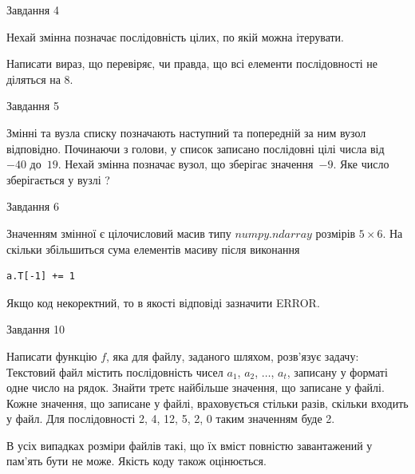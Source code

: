 \documentclass[12pt, ukrainian]{article}
\begin{document}
{               
{\begin{center}Завдання {4}\end{center}}
\vspace{-6mm}
Нехай змінна  позначає послідовність цілих, по якій можна ітерувати.

Написати вираз, що перевіряє, чи правда, що всі елементи послідовності не діляться на 8.\par

\vspace{10mm}
               
{\begin{center}Завдання {5}\end{center}}
\vspace{-6mm}
Змінні  та  вузла списку позначають наступний та попередній за ним вузол відповідно. Починаючи з голови, у список записано послідовні цілі числа від~$-40$ до~$19$. Нехай змінна  позначає вузол, що зберігає значення~$-9$.
Яке число зберігається у вузлі  ?\par

               
{\begin{center}Завдання {6}\end{center}}
\vspace{-6mm}
Значенням змінної  є цілочисловий масив типу $numpy.ndarray$ розмірів $5{\times}6$. На скільки збільшиться сума елементів масиву  після виконання
\begin{verbatim}
a.T[-1] += 1
\end{verbatim}


Якщо код некоректний, то в якості відповіді зазначити ERROR.\par

               
{\begin{center}Завдання {10}\end{center}}
\vspace{-6mm}

Написати функцію $f$, яка для файлу, заданого шляхом, розв’язує задачу:\\ Текстовий файл містить послідовність чисел $a_1$, $a_2$, $\ldots$, $a_t$, записану у форматі одне число на рядок. Знайти третє найбільше значення, що записане у файлі. Кожне значення, що записане у файлі, враховується стільки разів, скільки входить у файл. Для послідовності 2, 4, 12, 5, 2, 0 таким значенням буде 2.

В усіх випадках розміри файлів такі, що їх вміст повністю завантажений у пам'ять бути не може. Якість коду також оцінюється.



}
\end{document}
